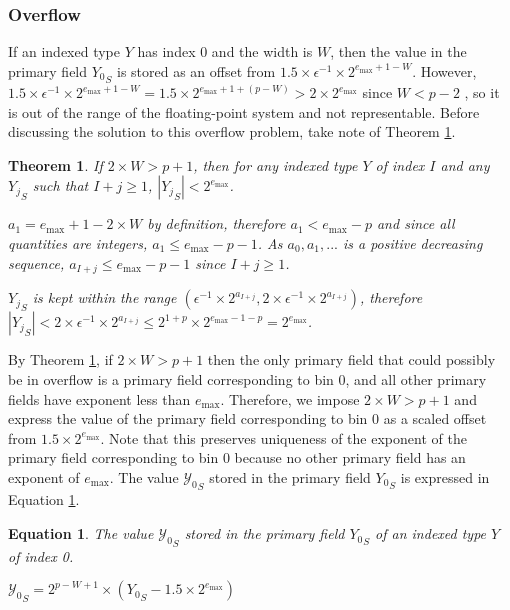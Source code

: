 \documentclass[12pt]{article}
\providecommand{\max}{\ensuremath{\text{max}}}
\theoremstyle{plain}
\newtheorem{thm}{Theorem}[section]
\newtheorem{eq}{Equation}[section]
\begin{document}
    \subsubsection{Overflow}
      \label{sec:overflow}
      If an indexed type $Y$ has index 0 and the width is $W$, then the value in the primary field ${Y_0}_S$ is stored as an offset from $1.5\times\epsilon^{-1}\times2^{e_{\max} + 1 - W}$. However, $1.5\times\epsilon^{-1}\times2^{e_{\max} + 1 - W} = 1.5 \times 2^{e_{\max} + 1 + (p - W)} > 2 \times 2^{e_{\max}}$ since $W < p - 2$ \cite{repsum}, so it is out of the range of the floating-point system and not representable. Before discussing the solution to this overflow problem, take note of Theorem \ref{thm:overflow}.
      \begin{thm}
        If $2\times W > p + 1$, then for any indexed type $Y$ of index $I$ and any ${Y_j}_S$ such that $I + j \geq 1$, $|{Y_j}_S| < 2^{e_{\max}}$.

        $a_1 = e_{\max} + 1 - 2\times W$ by definition, therefore $a_1 < e_{\max} - p$ and since all quantities are integers, $a_1 \leq e_{\max} - p - 1$. As $a_0, a_1, ...$ is a positive decreasing sequence, $a_{I + j} \leq e_{\max} - p - 1$ since $I + j \geq 1$.

        ${Y_j}_S$ is kept within the range $(\epsilon^{-1} \times 2^{a_{I + j}}, 2 \times \epsilon^{-1} \times 2^{a_{I + j}})$, therefore
        $|{Y_j}_S| < 2 \times \epsilon^{-1} \times 2^{a_{I + j}} \leq 2^{1 + p} \times 2^{e_{\max} - 1 - p} = 2^{e_{\max}}$.

        \label{thm:overflow}
      \end{thm}
      By Theorem \ref{thm:overflow}, if $2\times W > p + 1$ then the only primary field that could possibly be in overflow is a primary field corresponding to bin 0, and all other primary fields have exponent less than $e_{\max}$. Therefore, we impose $2\times W > p + 1$ and express the value of the primary field corresponding to bin 0 as a scaled offset from $1.5\times2^{e_{\max}}$. Note that this preserves uniqueness of the exponent of the primary field corresponding to bin 0 because no other primary field has an exponent of $e_{\max}$. The value ${\mathcal{Y}_0}_S$ stored in the primary field ${Y_0}_S$ is expressed in Equation \ref{eq:pri0}.
      \begin{eq} The value ${\mathcal{Y}_0}_S$ stored in the primary field ${Y_0}_S$ of an indexed type $Y$ of index 0.

        ${\mathcal{Y}_0}_S = 2^{p - W + 1}\times({Y_0}_S - 1.5\times2^{e_{\max}})$
        \label{eq:pri0}
      \end{eq}
\end{document}
